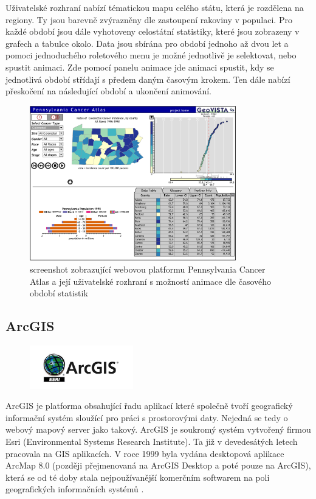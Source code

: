 Uživatelské rozhraní nabízí tématickou mapu celého státu, která je
rozdělena na regiony. Ty jsou barevně zvýrazněny dle zastoupení
rakoviny v populaci. Pro každé období jsou dále vyhotoveny celostátní
statistiky, které jsou zobrazeny v grafech a tabulce okolo. Data jsou
sbírána pro období jednoho až dvou let a pomoci jednoduchého
roletového menu je možné jednotlivě je selektovat, nebo spustit
animaci. Zde pomocí panelu animace jde animaci spustit, kdy se
jednotlivá období střídají s předem daným časovým krokem. Ten dále
nabízí přeskočení na následující období a ukončení animování.

\begin{figure}[h!]  \centering
\includegraphics[width=0.8\textwidth]{../img/pennsylvania-cancer-atlas.png}
	\caption{screenshot zobrazující webovou platformu Pennsylvania
Cancer Atlas a její uživatelské rozhraní s možností animace dle
časového období statistik}
	\label{fig:gay-sands}
\end{figure}
 
\newpage
\subsection{ArcGIS}

\begin{figure}[h!]  \centering
\includegraphics[width=0.4\textwidth]{../img/arcgis-logo.jpg}
	\label{fig:arcgis-logo}
\end{figure} \bigskip

ArcGIS je platforma obsahující řadu aplikací které společně tvoří
geografický informační systém sloužící pro práci s prostorovými
daty. Nejedná se tedy o webový mapový server jako takový. ArcGIS je
soukromý systém vytvořený firmou Esri (Environmental Systems Research
Institute). Ta již v devedesátých letech pracovala na GIS
aplikacích. V roce 1999 byla vydána desktopová aplikace ArcMap 8.0
(později přejmenovaná na ArcGIS Desktop a poté pouze na ArcGIS), která
se od té doby stala nejpoužívanější komerčním softwarem na poli
geografických informačních systémů \cite{arcgis_history}.

